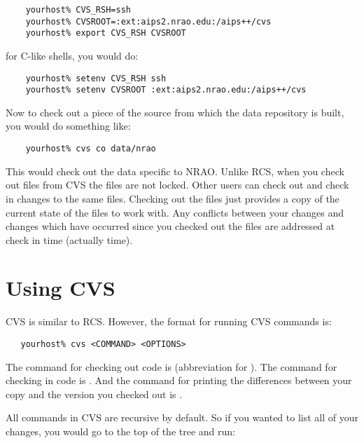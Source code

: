 \begin{verbatim}
    yourhost% CVS_RSH=ssh
    yourhost% CVSROOT=:ext:aips2.nrao.edu:/aips++/cvs
    yourhost% export CVS_RSH CVSROOT
\end{verbatim}

\noindent
for C-like shells, you would do:

\begin{verbatim}
    yourhost% setenv CVS_RSH ssh
    yourhost% setenv CVSROOT :ext:aips2.nrao.edu:/aips++/cvs
\end{verbatim}

Now to check out a piece of the source from which the data repository is
built, you would do something like:

\begin{verbatim}
    yourhost% cvs co data/nrao
\end{verbatim}

\noindent
This would check out the data specific to NRAO. Unlike RCS, when you check
out files from CVS the files are not locked. Other users can check out and
check in changes to the same files. Checking out the files just provides
a copy of the current state of the files to work with. Any conflicts
between your changes and changes which have occurred since you checked
out the files are addressed at check in time (actually 
time).


\section{Using CVS}
\label{data repository cvs}

CVS is similar to RCS. However, the format for running CVS commands is:

\begin{verbatim}
   yourhost% cvs <COMMAND> <OPTIONS>
\end{verbatim}

\noindent
The command for checking out code is  (abbreviation for ).
The command for checking in code is . And the command for printing
the differences between your copy and the version you checked out is .

All commands in CVS are recursive by default. So if you wanted to list all of your
changes, you would go to the top of the tree and run:

